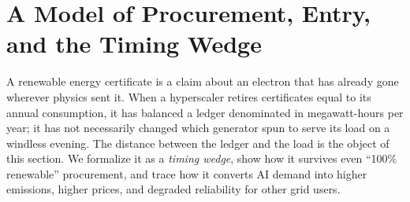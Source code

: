 \documentclass[a4paper,fleqn,longmktitle]{cas-sc}
\theoremstyle{plain}
\theoremstyle{definition}
\begin{document}



\section{A Model of Procurement, Entry, and the Timing Wedge}\label{sec:model}

A renewable energy certificate is a claim about an electron that has already gone wherever physics sent it. When a hyperscaler retires certificates equal to its annual consumption, it has balanced a ledger denominated in megawatt-hours per year; it has not necessarily changed which generator spun to serve its load on a windless evening. The distance between the ledger and the load is the object of this section. We formalize it as a \emph{timing wedge}, show how it survives even ``100\% renewable'' procurement, and trace how it converts AI demand into higher emissions, higher prices, and degraded reliability for other grid users.
\end{document}
